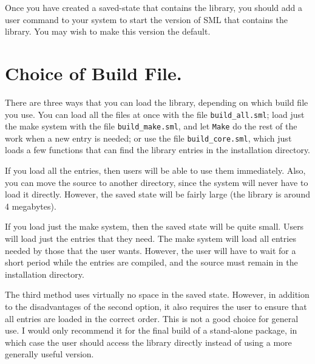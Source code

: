 Once you have created a saved-state that contains the library, you
should add a user command to your system to start the version of SML
that contains the library.  You may wish to make this version the
default.


\section{Choice of Build File.}

There are three ways that you can load the
library, depending on which build file you use.  You can load all
the files at once with the file {\tt build\_all.sml}; load just the
make system with the file {\tt build\_make.sml}, and let {\tt Make} do
the rest of the work when a new entry is needed; or use the file
{\tt build\_core.sml}, which just loads a
few functions that can find the library entries in the installation
directory.

If you load all the entries, then users will be able to use them
immediately.  Also, you can move the source to another directory,
since the system will never have to load it directly.  However,
the saved state will be fairly large (the library is around 4
megabytes).

If you load just the make system, then the saved state will be
quite small.  Users will load just the entries that they need.
The make system will load all entries needed by those
that the user wants.  However, the user will have to wait for
a short period while the entries are compiled, and the source
must remain in the installation directory.

The third method uses virtually no space in the saved state.
However, in addition to the disadvantages of the second option,
it also requires the user to ensure that all entries are loaded
in the correct order.  This is not a good choice for general use.
I would only recommend it for the final build of a stand-alone
package, in which case the user should access the library
directly instead of using a more generally useful version.

 

